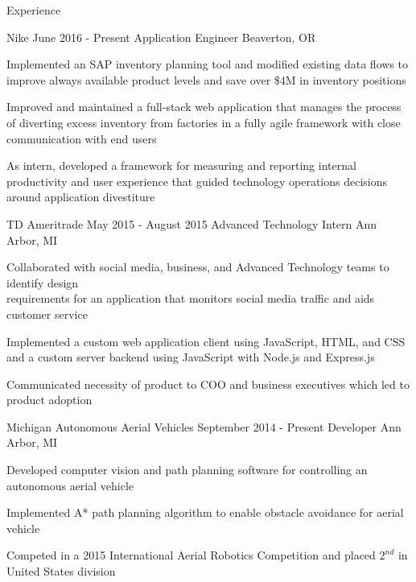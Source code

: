\documentclass{resume}
\begin{document}
\begin{rSection}{Experience}

\begin{rSubsection}{Nike}
                   {June 2016 - Present}
                   {Application Engineer}
                   {Beaverton, OR}
    \item Implemented an SAP inventory planning tool and modified existing data flows
          to improve always available product levels and save over \$4M in inventory positions
    \item Improved and maintained a full-stack web application that manages the process of
          diverting excess inventory from factories in a fully agile framework with close
          communication with end users
    \item As intern, developed a framework for measuring and reporting internal productivity
          and user experience that guided technology operations decisions around application
          divestiture
\end{rSubsection}

\begin{rSubsection}{TD Ameritrade}
                   {May 2015 - August 2015}
                   {Advanced Technology Intern}
                   {Ann Arbor, MI}
    \item Collaborated with social media, business, and Advanced Technology
          teams to identify design \\ requirements for an application that
          monitors social media traffic and aids customer service
    \item Implemented a custom web application client using JavaScript, HTML,
          and CSS and a custom server backend using JavaScript with Node.js and
          Express.js
    \item Communicated necessity of product to COO and business executives which
          led to product adoption 
\end{rSubsection}


\begin{rSubsection}{Michigan Autonomous Aerial Vehicles}
                   {September 2014 - Present}
                   {Developer}
                   {Ann Arbor, MI}
    \item Developed computer vision and path planning software for controlling
          an autonomous aerial vehicle
    \item Implemented A* path planning algorithm to enable obstacle
          avoidance for aerial vehicle
    \item Competed in a 2015 International Aerial Robotics Competition and
          placed $2^{nd}$ in United States division
\end{rSubsection}


\end{rSection}
\end{document}
